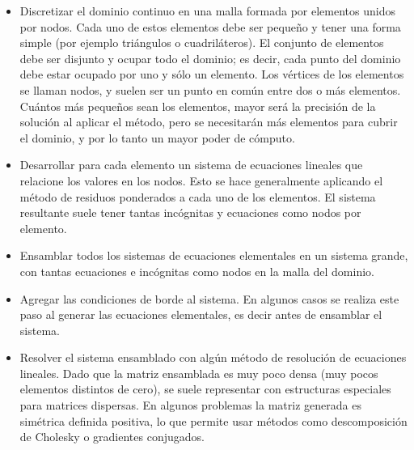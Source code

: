 \documentclass[11pt,a4paper,twoside]{tesis}
\begin{document}
\begin{itemize}
	\item Discretizar el dominio continuo en una malla formada por elementos unidos por nodos. Cada uno de estos elementos debe ser pequeño y tener una forma simple (por ejemplo triángulos o cuadriláteros). El conjunto de elementos debe ser disjunto y ocupar todo el dominio; es decir, cada punto del dominio debe estar ocupado por uno y sólo un elemento. Los vértices de los elementos se llaman nodos, y suelen ser un punto en común entre dos o más elementos. Cuántos más pequeños sean los elementos, mayor será la precisión de la solución al aplicar el método, pero se necesitarán más elementos para cubrir el dominio, y por lo tanto un mayor poder de cómputo. 
	
	\item Desarrollar para cada elemento un sistema de ecuaciones lineales que relacione los valores en los nodos. Esto se hace generalmente aplicando el método de residuos ponderados a cada uno de los elementos. El sistema resultante suele tener tantas incógnitas y ecuaciones como nodos por elemento.
		
	\item Ensamblar todos los sistemas de ecuaciones elementales en un sistema grande, con tantas ecuaciones e incógnitas como nodos en la malla del dominio. 
	
	\item Agregar las condiciones de borde al sistema. En algunos casos se realiza este paso al generar las ecuaciones elementales, es decir antes de ensamblar el sistema.
	
	\item Resolver el sistema ensamblado con algún método de resolución de ecuaciones lineales. Dado que la matriz ensamblada es muy poco densa (muy pocos elementos distintos de cero), se suele representar con estructuras especiales para matrices dispersas. En algunos problemas la matriz generada es simétrica definida positiva, lo que permite usar métodos como descomposición de Cholesky o gradientes conjugados.
\end{itemize}

\end{document}
